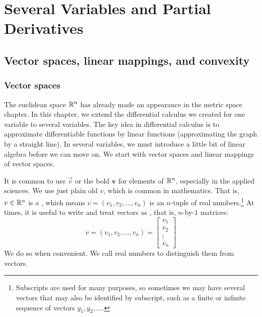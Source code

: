 \chapter{Several Variables and Partial Derivatives} \label{pd:chapter}


\section{Vector spaces, linear mappings, and convexity}
\label{sec:vectorspaces}



\subsection{Vector spaces}

The euclidean space ${\mathbb{R}}^n$ has already made an appearance in the metric
space chapter.  In this chapter, we extend the differential calculus
we created for one variable to several variables.  The key idea in
differential calculus is to approximate differentiable functions by linear
functions (approximating the graph by a straight line).
In several variables, we must introduce a little bit of linear
algebra before we can move on.
We start with vector spaces and linear mappings of vector spaces.

It is common to use $\vec{v}$ or the bold
$\mathbf{v}$ for elements of ${\mathbb{R}}^n$,
especially in the applied sciences.
We use just plain old $v$, which is common in mathematics.
That is, $v \in {\mathbb{R}}^n$ is a \emph{}, which means 
$v = (v_1,v_2,\ldots,v_n)$ is an $n$-tuple of
real numbers.\footnote{Subscripts are used for many purposes,
so sometimes we may have several vectors that may also
be identified by subscript, such as a finite or infinite sequence of
vectors $y_1,y_2,\ldots$.}
At times, it is useful to write and treat vectors as
\emph{}, that is, $n$-by-$1$ matrices:
\begin{equation*}
v =
(v_1,v_2,\ldots,v_n) =
{ \left[
\begin{smallmatrix}
v_1 \\ v_2 \\ \vdots \\ v_n
\end{smallmatrix}
\right]
}
\end{equation*}
We do so when convenient.
We call real numbers
\emph{} to distinguish them from vectors.

